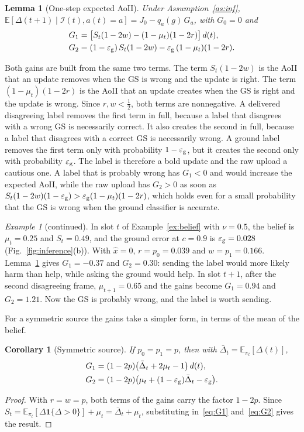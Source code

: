 \documentclass[journal]{IEEEtran}
\newtheorem{lemma}{Lemma}
\newtheorem{corollary}{Corollary}
\theoremstyle{remark}
\newtheorem{example}{Example}
\newcommand{\E}{\mathbb{E}}
\newcommand{\ind}[1]{\mathbf{1}\{#1\}}
\newcommand{\I}{\mathcal{I}}
\newcommand{\Dbar}{\bar{\Delta}}
\newcommand{\ee}{\varepsilon}
\newcommand{\xh}{\hat{x}}
\begin{document}
\begin{lemma}[One-step expected AoII]\label{lem:onestep}
Under Assumption~\ref{as:inf}, $\E[\Delta(t+1)\mid\I(t),a(t)=a]=J_0-q_a(g)\,G_a$, with $G_0=0$ and
\begin{align}
G_1&=\big[S_t(1-2w)-(1-\mu_t)(1-2r)\big]\,d(t), \label{eq:G1}\\
G_2&=(1-\ee_{\rm g})\,S_t(1-2w)-\ee_{\rm g}\,(1-\mu_t)(1-2r). \label{eq:G2}
\end{align}
\end{lemma}

Both gains are built from the same two terms. The term $S_t(1-2w)$ is the AoII that an update removes when the GS is wrong and the update is right. The term $(1-\mu_t)(1-2r)$ is the AoII that an update creates when the GS is right and the update is wrong. Since $r,w<\frac12$, both terms are nonnegative. A delivered disagreeing label removes the first term in full, because a label that disagrees with a wrong GS is necessarily correct. It also creates the second in full, because a label that disagrees with a correct GS is necessarily wrong. A ground label removes the first term only with probability $1-\ee_{\rm g}$, but it creates the second only with probability $\ee_{\rm g}$. The label is therefore a bold update and the raw upload a cautious one. A label that is probably wrong has $G_1<0$ and would increase the expected AoII, while the raw upload has $G_2>0$ as soon as $S_t(1-2w)(1-\ee_{\rm g})>\ee_{\rm g}(1-\mu_t)(1-2r)$, which holds even for a small probability that the GS is wrong when the ground classifier is accurate.

\setcounter{example}{0}
\begin{example}[continued]
In slot $t$ of Example~\ref{ex:belief} with $\nu=0.5$, the belief is $\mu_t=0.25$ and $S_t=0.49$, and the ground error at $c=0.9$ is $\ee_{\rm g}=0.028$ (Fig.~\ref{fig:inference}(b)). With $\xh=0$, $r=p_0=0.039$ and $w=p_1=0.166$. Lemma~\ref{lem:onestep} gives $G_1=-0.37$ and $G_2=0.30$: sending the label would more likely harm than help, while asking the ground would help. In slot $t+1$, after the second disagreeing frame, $\mu_{t+1}=0.65$ and the gains become $G_1=0.94$ and $G_2=1.21$. Now the GS is probably wrong, and the label is worth sending.
\end{example}

For a symmetric source the gains take a simpler form, in terms of the mean of the belief.

\begin{corollary}[Symmetric source]\label{cor:sym}
If $p_0=p_1=p$, then with $\Dbar_t=\E_{\pi_t}[\Delta(t)]$,
\begin{align*}
G_1&=(1-2p)\big(\Dbar_t+2\mu_t-1\big)\,d(t),\\
G_2&=(1-2p)\big(\mu_t+(1-\ee_{\rm g})\Dbar_t-\ee_{\rm g}\big).
\end{align*}
\end{corollary}
\begin{proof}
With $r=w=p$, both terms of the gains carry the factor $1-2p$. Since $S_t=\E_{\pi_t}[\Delta\ind{\Delta>0}]+\mu_t=\Dbar_t+\mu_t$, substituting in~\eqref{eq:G1} and~\eqref{eq:G2} gives the result.
\end{proof}
\end{document}
